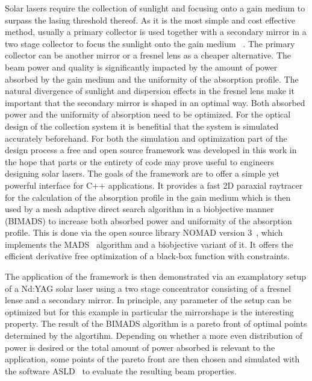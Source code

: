 \documentclass[a4paper,10pt]{article}
\begin{document}
    Solar lasers require the collection of sunlight and focusing
    onto a gain medium to surpass the lasing threshold thereof.
    As it is the most simple and cost effective method, usually
    a primary collector is used together with a secondary mirror in a 
    two stage collector to focus the sunlight onto the gain medium
    ~\cite{solar_lasers_magnesium}.
    The primary collector can be another mirror or a fresnel lens
    as a cheaper alternative.
    The beam power and quality is significantly impacted by the
    amount of power absorbed by the gain medium and the uniformity
    of the absorption profile.
    The natural divergence of sunlight and dispersion effects in the
    fresnel lens make it important that the secondary mirror is shaped
    in an optimal way.
    Both absorbed power and the uniformity of absorption need to be
    optimized.
    For the optical design of the collection system it is benefitial
    that the system is simulated accurately beforehand.
    For both the simulation and optimization part of the design process
    a free and open source framework was developed in this work in the
    hope that parts or the entirety of code may prove useful to engineers
    designing solar lasers.
    The goals of the framework are to offer a simple yet powerful interface
    for C++ applications.
    It provides a fast 2D paraxial raytracer for the calculation of the
    absorption profile in the gain medium which is then used by a
    mesh adaptive direct search algorithm in a biobjective manner (BIMADS) 
    to increase both absorbed power and uniformity of the absorption profile.
    This is done via the open source library NOMAD version 3~\cite{nomad3},
    which implements the MADS~\cite{mads_original} algorithm and a biobjective
    variant of it. 
    It offers the efficient derivative free optimization of a black-box
    function with constraints.

    The application of the framework is then demonstrated via an examplatory
    setup of a Nd:YAG solar laser using a two stage concentrator consisting
    of a fresnel lense and a secondary mirror.
    In principle, any parameter of the setup can be optimized but for this
    example in particular the mirrorshape is the interesting property. 
    The result of the BIMADS algorithm is a pareto front of optimal points 
    determined by the algortihm.
    Depending on whether a more even distribution of power is desired or
    the total amount of power absorbed is relevant to the application,
    some points of the pareto front are then chosen and simulated with
    the software ASLD~\cite{asld_website} to evaluate the resulting beam properties.
\end{document}
